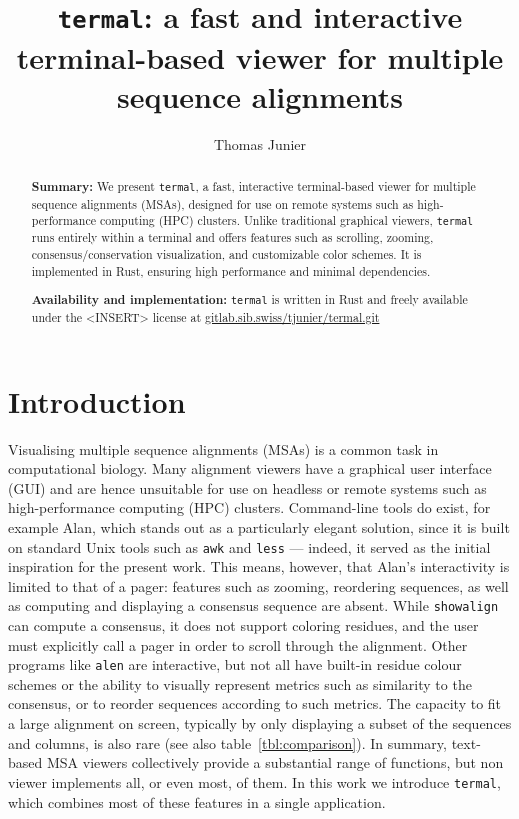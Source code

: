 \documentclass[11pt]{article}
\title{%
\texttt{termal}: a fast and interactive terminal-based viewer for multiple sequence alignments
}
\author[1]{Thomas Junier}
\affil[1]{Swiss Institute of Bioinformatics, Vital-\textsc{it} Group, Bâtiment
Amphipôle, Quartier UNIL-Sorge, CH-1015 Lausanne, Switzerland\\
\texttt{thomas.junier@sib.swiss}}
\date{} %
\begin{document}
\maketitle

\begin{abstract} \textbf{Summary:} We present \texttt{termal}, a fast,
  interactive terminal-based viewer for multiple sequence alignments (MSAs),
  designed for use on remote systems such as high-performance computing (HPC)
  clusters. Unlike traditional graphical viewers, \texttt{termal} runs entirely
  within a terminal and offers features such as scrolling, zooming,
  consensus/conservation visualization, and customizable color schemes. It is
  implemented in Rust, ensuring high performance and minimal dependencies.

	\textbf{Availability and implementation:} \texttt{termal} is written in Rust
	and freely available under the <INSERT> license at
	\url{gitlab.sib.swiss/tjunier/termal.git}

\end{abstract}

\section*{Introduction}

Visualising multiple sequence alignments (MSAs) is a common task in
computational biology. Many alignment viewers have a graphical user interface
(GUI) and are hence unsuitable for use on headless or remote systems such as
high-performance computing (HPC) clusters.  Command-line tools do exist, for
example Alan\cite{alan}, which stands out as a particularly elegant solution,
since it is built on standard Unix tools such as \texttt{awk} and \texttt{less}
--- indeed, it served as the initial inspiration for the present work. This
means, however, that Alan's interactivity is limited to that of a pager:
features such as zooming, reordering sequences, as well as computing and
displaying a consensus sequence are absent. While
\texttt{showalign}\cite{emboss} can compute a consensus, it does not support
coloring residues, and the user must explicitly call a pager in order to scroll
through the alignment. Other programs like \texttt{alen}\cite{alen} are
interactive, but not all have built-in residue colour schemes or the ability to
visually represent metrics such as similarity to the consensus, or to reorder
sequences according to such metrics. The capacity to fit a large alignment on
screen, typically by only displaying a subset of the sequences and columns, is
also rare (see also table~\ref{tbl:comparison}). In summary, text-based MSA
viewers collectively provide a substantial range of functions, but non viewer
implements all, or even most, of them. In this work we introduce
\texttt{termal}, which combines most of these features in a single application.
\end{document}
